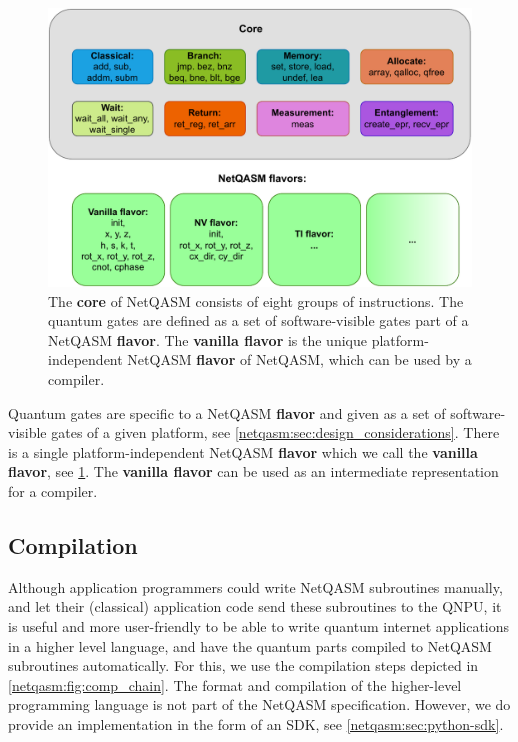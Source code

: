 \begin{figure}
      \centering
      \includegraphics[width=0.8\linewidth]{figures/netqasm/instructions.pdf}
      \caption{The \textbf{core} of \ac{NetQASM} consists of eight groups of
            instructions. The quantum gates are defined as a set of software-visible
            gates part of a \ac{NetQASM} \textbf{flavor}. The \textbf{vanilla flavor}
            is the unique platform-independent \ac{NetQASM} \textbf{flavor} of
            \ac{NetQASM}, which can be used by a compiler.}\label{netqasm:fig:instructions}
\end{figure}

Quantum gates are specific to a \ac{NetQASM} \textbf{flavor} and given as a set of software-visible gates of a given platform, see \cref{netqasm:sec:design_considerations}.
There is a single platform-independent \ac{NetQASM} \textbf{flavor} which we call the \textbf{vanilla flavor}, see \cref{netqasm:fig:instructions}.
The \textbf{vanilla flavor} can be used as an intermediate representation for a compiler.


\subsection{Compilation}
Although application programmers could write \ac{NetQASM} subroutines manually, and let their (classical) application code send these subroutines to the \ac{QNPU}, it is useful and more user-friendly to be able to write quantum internet applications in a higher level language, and have the quantum parts compiled to \ac{NetQASM} subroutines automatically.
For this, we use the compilation steps depicted in \cref{netqasm:fig:comp_chain}.
The format and compilation of the higher-level programming language is not part of the \ac{NetQASM} specification.
However, we do provide an implementation in the form of an SDK, see \cref{netqasm:sec:python-sdk}.

